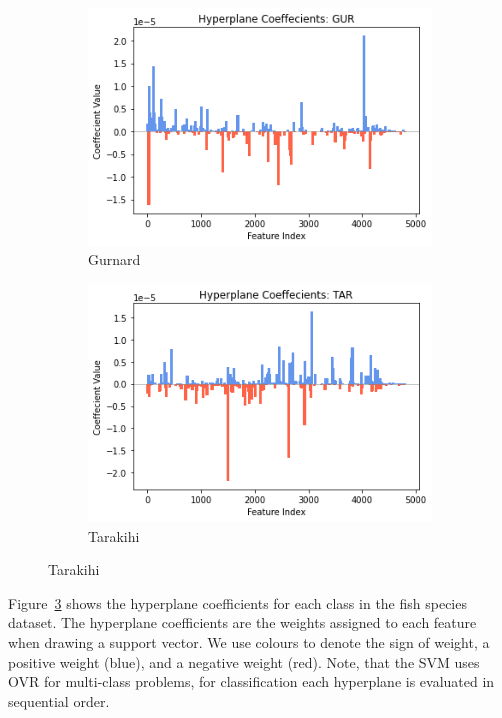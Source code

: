 \documentclass[runningheads]{llncs}
\begin{document}
\begin{figure}[htb]
\begin{subfigure}[b]{.49\linewidth}
    \includegraphics[width=\linewidth]{fish_hyperplane_gur.png}
    \caption{Gurnard}\label{fig:hyperplane-gur}
  \end{subfigure}
  \begin{subfigure}[b]{.49\linewidth}
    \includegraphics[width=\linewidth]{fish_hyperplane_tar.png}
    \caption{Tarakihi}\label{fig:hyperplane-tar}
  \end{subfigure}
  \label{fig:svm-hyperplane}
\end{figure}

Figure~\ref{fig:svm-hyperplane} shows the hyperplane coefficients for each class in the fish species dataset. 
The hyperplane coefficients are the weights assigned to each feature when drawing a support vector. 
We use colours to denote the sign of weight, a positive weight (blue), and a negative weight (red). 
Note, that the SVM uses OVR for multi-class problems, for classification each hyperplane is evaluated in sequential order.
\end{document}
